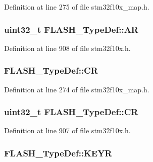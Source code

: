 Definition at line 275 of file stm32f10x\+\_\+map.\+h.

\subsubsection[{\texorpdfstring{AR}{AR}}]{ {\bf uint32\+\_\+t} F\+L\+A\+S\+H\+\_\+\+Type\+Def\+::\+AR}\hypertarget{struct_f_l_a_s_h___type_def_a9cd77bc29038841798b4b63c5cecdb9d}{}\label{struct_f_l_a_s_h___type_def_a9cd77bc29038841798b4b63c5cecdb9d}


Definition at line 908 of file stm32f10x.\+h.

\subsubsection[{\texorpdfstring{CR}{CR}}]{ F\+L\+A\+S\+H\+\_\+\+Type\+Def\+::\+CR}\hypertarget{struct_f_l_a_s_h___type_def_a79b1802363c3c5f33428f7b995496694}{}\label{struct_f_l_a_s_h___type_def_a79b1802363c3c5f33428f7b995496694}


Definition at line 274 of file stm32f10x\+\_\+map.\+h.

\subsubsection[{\texorpdfstring{CR}{CR}}]{ {\bf uint32\+\_\+t} F\+L\+A\+S\+H\+\_\+\+Type\+Def\+::\+CR}\hypertarget{struct_f_l_a_s_h___type_def_a7919306d0e032a855200420a57f884d7}{}\label{struct_f_l_a_s_h___type_def_a7919306d0e032a855200420a57f884d7}


Definition at line 907 of file stm32f10x.\+h.

\subsubsection[{\texorpdfstring{K\+E\+YR}{KEYR}}]{ F\+L\+A\+S\+H\+\_\+\+Type\+Def\+::\+K\+E\+YR}\hypertarget{struct_f_l_a_s_h___type_def_a88e0901a9f9b6c157448a2817c4f1c7f}{}\label{struct_f_l_a_s_h___type_def_a88e0901a9f9b6c157448a2817c4f1c7f}


